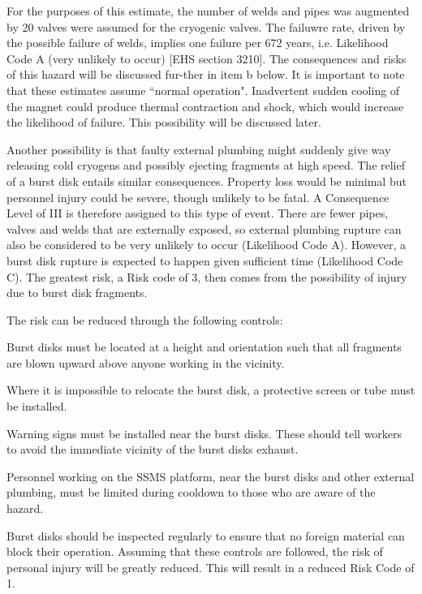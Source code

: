 {For the purposes of this estimate, the number of welds and pipes was augmented by 20%
valves were assumed for the cryogenic valves.  The failuwre rate, driven by the possible failure of welds, 
implies one failure per 672 years, i.e. Likelihood Code A (very unlikely to occur) [EHS section 3210].  The consequences 
and risks of this hazard will be discussed fur-ther in item b below.  It is important to note that these 
estimates assume ``normal operation".  Inadvertent sudden cooling of the magnet could produce thermal 
contraction and shock, which would increase the likelihood of failure.  This possibility will be discussed 
later.

Another possibility is that faulty external plumbing might suddenly give way releasing cold cryogens and 
possibly ejecting fragments at high speed.  The relief of a burst disk entails similar consequences.  
Property loss would be minimal but personnel injury could be severe, though unlikely to be fatal.  A 
Consequence Level of III is therefore assigned to this type of event.  There are fewer pipes, valves 
and welds that are externally exposed, so external plumbing rupture can also be considered to be very 
unlikely to occur (Likelihood Code A).  However, a burst disk rupture is expected to happen given 
sufficient time (Likelihood Code C).  The greatest risk, a Risk code of 3, then comes from the possibility 
of injury due to burst disk fragments.

The risk can be reduced through the following controls:
\begin{list}{.~}{\setlength{\itemsep}{-0.15cm}}
   \item Burst disks must be located at a height and orientation such that all fragments 
         are blown upward above anyone working in the vicinity.
   \item Where it is impossible to relocate the burst disk, a protective screen or tube must be installed.
   \item Warning signs must be installed near the burst disks.  These should tell workers 
         to avoid the immediate vicinity of the burst disks exhaust.
   \item Personnel working on the SSMS platform, near the burst disks and other 
         external plumbing, must be limited during cooldown to those who are aware of the hazard.
   \item Burst disks should be inspected regularly to ensure that no foreign material can block 
         their operation. Assuming that these controls are followed, the risk of personal injury 
         will be greatly reduced.  This will result in a reduced Risk Code of 1.
\end{list}


}
